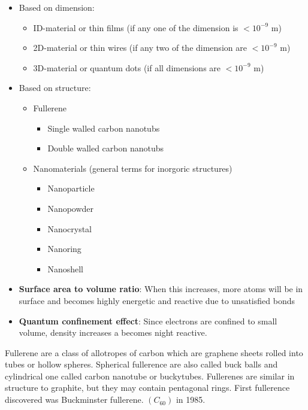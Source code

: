 \documentclass[12pt, a4paper]{article}
\begin{document}
\begin{itemize}
	\item Based on dimension:
	      \begin{itemize}
		      \item ID-material or thin films (if any one of the dimension is $<10^{-9}$ m)
		      \item 2D-material or thin wires (if any two of the dimension are $<10^{-9}$ m)
		      \item 3D-material or quantum dots (if all dimensions are $<10^{-9}$ m)
	      \end{itemize}
	\item Based on structure:
	      \begin{itemize}
		      \item Fullerene
		            \begin{itemize}
			            \item Single walled carbon nanotubs
			            \item Double walled carbon nanotubs
		            \end{itemize}
		      \item Nanomaterials (general terms for inorgoric structures)
		            \begin{itemize}
			            \item Nanoparticle
			            \item Nanopowder
			            \item Nanocrystal
			            \item Nanoring
			            \item Nanoshell
		            \end{itemize}
	      \end{itemize}
\end{itemize}

\begin{framed}
	{
		\begin{itemize}
			\item \textbf{Surface area to volume ratio}: When this increases, more atoms will be in surface and becomes highly energetic and reactive due to unsatisfied bonds
			\item \textbf{Quantum confinement effect}: Since electrons are confined to small volume, density increases a becomes night reactive.
		\end{itemize}
	}
\end{framed}
\doparindent
Fullerene are a class of allotropes of carbon which are graphene sheets rolled into tubes or hollow spheres. Spherical fullerence are also called buck balls and cylindrical one called carbon nanotube or buckytubes. Fullerenes are similar in structure to graphite, but they may contain pentagonal rings. First fullerence discovered was Buckminster fullerene. $\left(C_{60}\right)$ in 1985.
\end{document}
